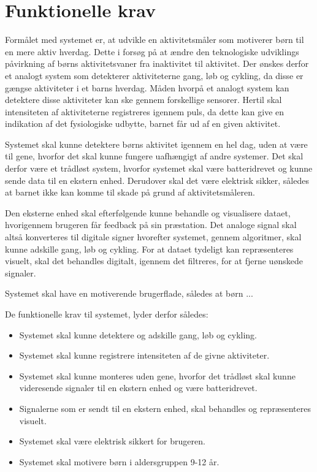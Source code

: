 \section{Funktionelle krav}



Formålet med systemet er, at udvikle en aktivitetsmåler som motiverer børn til en mere aktiv hverdag. Dette i forsøg på at ændre den teknologiske udviklings påvirkning af børns aktivitetsvaner fra inaktivitet til aktivitet.
Der ønskes derfor et analogt system som detekterer aktiviteterne gang, løb og cykling, da disse er gængse aktiviteter i et barns hverdag. Måden hvorpå et analogt system kan detektere disse aktiviteter kan ske gennem forskellige sensorer.
Hertil skal intensiteten af aktiviteterne registreres igennem puls, da dette kan give en indikation af det fysiologiske udbytte, barnet får ud af en given aktivitet.

Systemet skal kunne detektere børns aktivitet igennem en hel dag, uden at være til gene, hvorfor det skal kunne fungere uafhængigt af andre systemer. Det skal derfor være et trådløst system, hvorfor systemet skal være batteridrevet og kunne sende data til en ekstern enhed. Derudover skal det være elektrisk sikker, således at barnet ikke kan komme til skade på grund af aktivitetsmåleren. 

Den eksterne enhed skal efterfølgende kunne behandle og visualisere dataet, hvorigennem brugeren får feedback på sin præstation. Det analoge signal skal altså konverteres til digitale signer hvorefter systemet, gennem algoritmer, skal kunne adskille gang, løb og cykling. For at dataet tydeligt kan repræsenteres visuelt, skal det behandles digitalt, igennem det filtreres, for at fjerne uønskede signaler. 

Systemet skal have en motiverende brugerflade, således at børn ...






De funktionelle krav til systemet, lyder derfor således: 
\begin{itemize}
	\item Systemet skal kunne detektere og adskille gang, løb og cykling.
	\item Systemet skal kunne registrere intensiteten af de givne aktiviteter.
	\item Systemet skal kunne monteres uden gene, hvorfor det trådløst skal kunne videresende signaler til en ekstern enhed og være batteridrevet.
	\item Signalerne som er sendt til en ekstern enhed, skal behandles og repræsenteres visuelt.
	\item Systemet skal være elektrisk sikkert for brugeren.
	\item Systemet skal motivere børn i aldersgruppen 9-12 år. %
\end{itemize}










